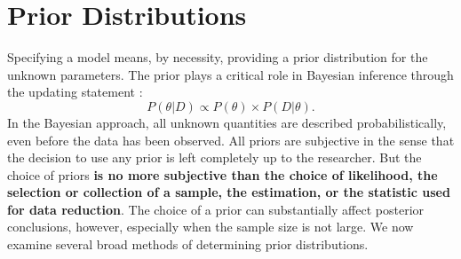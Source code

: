 \section{Prior Distributions}
Specifying a model means, by necessity, providing a prior distribution for the unknown parameters. The prior plays a critical role in Bayesian inference through the updating statement : $$P(\theta|D) \propto P(\theta) \times P(D|\theta).$$  In the Bayesian approach, all unknown quantities are described probabilistically, even before the data has been observed.  All priors are subjective in the sense that the decision to use any prior is left completely up to the researcher.  But the choice of priors \textbf{is no more subjective than the choice of likelihood, the selection or collection of a sample, the estimation, or the statistic used for data reduction}.  The choice of a prior can substantially affect posterior conclusions, however, especially when the sample size is not large. \newl
We now examine several broad methods of determining prior distributions.
